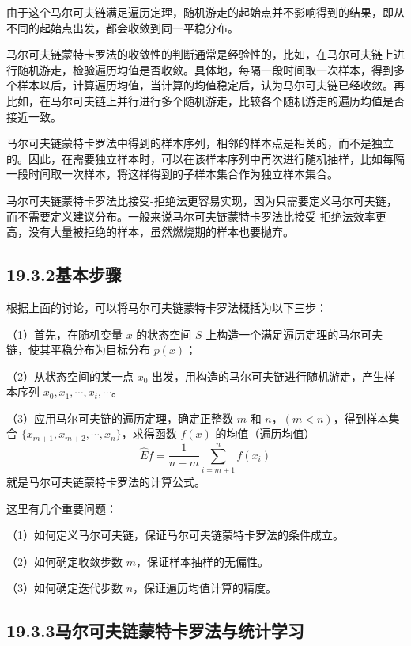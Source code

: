 \documentclass[UTF8,12pt,a4paper,fontset=fandol]{ctexart}
\begin{document}
由于这个马尔可夫链满足遍历定理，随机游走的起始点并不影响得到的结果，即从不同的起始点出发，都会收敛到同一平稳分布。

马尔可夫链蒙特卡罗法的收敛性的判断通常是经验性的，比如，在马尔可夫链上进行随机游走，检验遍历均值是否收敛。具体地，每隔一段时间取一次样本，得到多个样本以后，计算遍历均值，当计算的均值稳定后，认为马尔可夫链已经收敛。再比如，在马尔可夫链上并行进行多个随机游走，比较各个随机游走的遍历均值是否接近一致。

马尔可夫链蒙特卡罗法中得到的样本序列，相邻的样本点是相关的，而不是独立的。因此，在需要独立样本时，可以在该样本序列中再次进行随机抽样，比如每隔一段时间取一次样本，将这样得到的子样本集合作为独立样本集合。

马尔可夫链蒙特卡罗法比接受-拒绝法更容易实现，因为只需要定义马尔可夫链，而不需要定义建议分布。一般来说马尔可夫链蒙特卡罗法比接受-拒绝法效率更高，没有大量被拒绝的样本，虽然燃烧期的样本也要抛弃。

\subsection*{19.3.2\quad 基本步骤}

根据上面的讨论，可以将马尔可夫链蒙特卡罗法概括为以下三步：

（1）首先，在随机变量 $x$ 的状态空间 $S$ 上构造一个满足遍历定理的马尔可夫链，使其平稳分布为目标分布 $p(x)$；

（2）从状态空间的某一点 $x_0$ 出发，用构造的马尔可夫链进行随机游走，产生样本序列 $x_0,x_1,\cdots,x_t,\cdots$。

（3）应用马尔可夫链的遍历定理，确定正整数 $m$ 和 $n$，$(m<n)$，得到样本集合 $\{x_{m+1},x_{m+2},\cdots,x_n\}$，求得函数 $f(x)$ 的均值（遍历均值）
\begin{equation}
\hat E f=\frac{1}{n-m}\sum_{i=m+1}^{n}f(x_i)
\tag{19.33}
\end{equation}
就是马尔可夫链蒙特卡罗法的计算公式。

这里有几个重要问题：

（1）如何定义马尔可夫链，保证马尔可夫链蒙特卡罗法的条件成立。

（2）如何确定收敛步数 $m$，保证样本抽样的无偏性。

（3）如何确定迭代步数 $n$，保证遍历均值计算的精度。

\subsection*{19.3.3\quad 马尔可夫链蒙特卡罗法与统计学习}
\end{document}
